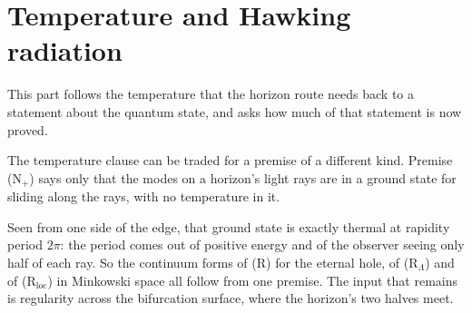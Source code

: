 \documentclass[11pt]{article}
\theoremstyle{definition}
\theoremstyle{plain}
\begin{document}
\section{Temperature and Hawking radiation}

This part follows the temperature that the horizon route needs back to a statement about the quantum state, and asks how much of that statement is now proved.

The temperature clause can be traded for a premise of a different kind. Premise (N$_{+}$) says only that the modes on a horizon's light rays are in a ground state for sliding along the rays, with no temperature in it.

Seen from one side of the edge, that ground state is exactly thermal at rapidity period $2\pi$: the period comes out of positive energy and of the observer seeing only half of each ray. So the continuum forms of (R) for the eternal hole, of (R$_{\Lambda}$) and of (R$_{\mathrm{loc}}$) in Minkowski space all follow from one premise. The input that remains is regularity across the bifurcation surface, where the horizon's two halves meet.
\end{document}

